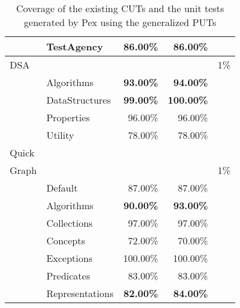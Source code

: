 \begin{table}[t]
\begin{tabular}{|l|l|r|r|c|}
						& TestAgency 							&  86.00\%					&  86.00\%					& 		\\ \cline{2-4}
\hline
\hline
DSA 				& \multicolumn{3}{|c|}{} 																					& 1\% \\ \hline
						& Algorithms							& \textbf{93.00\%}	&  \textbf{94.00\%}	& 		\\ \cline{2-4}
						& DataStructures					& \textbf{99.00\%}	& \textbf{100.00\%}	&			\\ \cline{2-4}
						& Properties							& 96.00\%						&  96.00\%					& 		\\ \cline{2-4}
						& Utility 								& 78.00\% 					&  78.00\%					&			\\ \cline{2-4}
\hline
\hline
Quick				& \multicolumn{3}{|c|}{} 														  						&			\\ 
Graph				& \multicolumn{3}{|c|}{} 																					&	1\%	\\ \hline
						& Default									& 87.00\%						&  87.00\%					& 		\\ \cline{2-4}
						& Algorithms							& \textbf{90.00\%}	&  \textbf{93.00\%}	&			\\ \cline{2-4}
						& Collections							& 97.00\%						&  97.00\%					& 		\\ \cline{2-4}
						& Concepts 								& 72.00\% 					&  70.00\%					&			\\ \cline{2-4}
						& Exceptions 							&100.00\% 					& 100.00\%					&			\\ \cline{2-4}
						& Predicates 							& 83.00\% 					&  83.00\%					&			\\ \cline{2-4}
						& Representations					& \textbf{82.00\%}	&  \textbf{84.00\%} &			\\ \cline{2-4}
\hline
\hline
\end{tabular}
\caption{Coverage of the existing CUTs and the unit tests generated by Pex using the generalized PUTs}
\label{tab:coverage}
\end{table}

